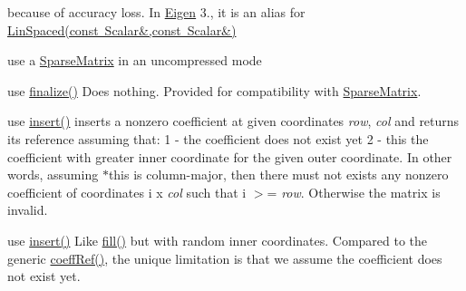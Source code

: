\begin{DoxyRefList}
%
because of accuracy loss. In \mbox{\hyperlink{namespace_eigen}{Eigen}} 3., it is an alias for \mbox{\hyperlink{class_eigen_1_1_dense_base_a7144cfa941183715fa8c3972621c0bca}{Lin\+Spaced(const Scalar\&,const Scalar\&)}} 
\item[Class \mbox{\hyperlink{class_eigen_1_1_dynamic_sparse_matrix}{Eigen::Dynamic\+Sparse\+Matrix}} ]\label{deprecated__deprecated000040}%
%
use a \mbox{\hyperlink{class_eigen_1_1_sparse_matrix}{Sparse\+Matrix}} in an uncompressed mode 
\item[Member \mbox{\hyperlink{class_eigen_1_1_dynamic_sparse_matrix_af40e202919029acf459fcccda785c806}{Eigen::Dynamic\+Sparse\+Matrix::end\+Fill}} ()]\label{deprecated__deprecated000044}%
%
use \mbox{\hyperlink{class_eigen_1_1_dynamic_sparse_matrix_a74b03c99d9d852888038be338995f1b9}{finalize()}} Does nothing. Provided for compatibility with \mbox{\hyperlink{class_eigen_1_1_sparse_matrix}{Sparse\+Matrix}}.  
\item[Member \mbox{\hyperlink{class_eigen_1_1_dynamic_sparse_matrix_a4c66f2b97c6aad9e0ec0a56eaea5994d}{Eigen::Dynamic\+Sparse\+Matrix::fill}} (Index row, Index col)]\label{deprecated__deprecated000042}%
%
use \mbox{\hyperlink{class_eigen_1_1_dynamic_sparse_matrix_a376b84b327540a8a810c38e9d7b8b498}{insert()}} inserts a nonzero coefficient at given coordinates {\itshape row}, {\itshape col} and returns its reference assuming that\+: 1 -\/ the coefficient does not exist yet 2 -\/ this the coefficient with greater inner coordinate for the given outer coordinate. In other words, assuming {\ttfamily $\ast$this} is column-\/major, then there must not exists any nonzero coefficient of coordinates {\ttfamily i} {\ttfamily x} {\itshape col} such that {\ttfamily i} $>$= {\itshape row}. Otherwise the matrix is invalid. 
\item[Member \mbox{\hyperlink{class_eigen_1_1_dynamic_sparse_matrix_a51e88454dac0a742bc9809869330dd47}{Eigen::Dynamic\+Sparse\+Matrix::fillrand}} (Index row, Index col)]\label{deprecated__deprecated000043}%
%
use \mbox{\hyperlink{class_eigen_1_1_dynamic_sparse_matrix_a376b84b327540a8a810c38e9d7b8b498}{insert()}} Like \mbox{\hyperlink{class_eigen_1_1_dynamic_sparse_matrix_a4c66f2b97c6aad9e0ec0a56eaea5994d}{fill()}} but with random inner coordinates. Compared to the generic \mbox{\hyperlink{class_eigen_1_1_dynamic_sparse_matrix_a6b4e685fdb64e1e5699e9f26f720f973}{coeff\+Ref()}}, the unique limitation is that we assume the coefficient does not exist yet.  

\end{DoxyRefList}
